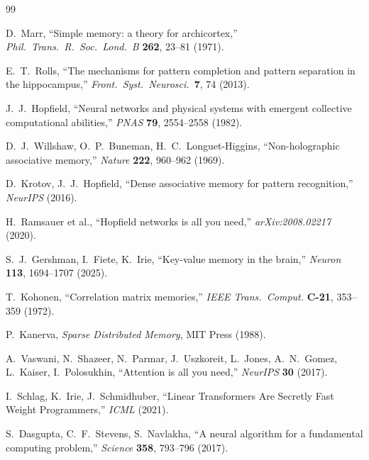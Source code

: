 \documentclass[11pt]{article}
\begin{document}

\begin{thebibliography}{99}

 D.~Marr, ``Simple memory: a theory for archicortex,''
\textit{Phil.\ Trans.\ R.\ Soc.\ Lond.\ B} \textbf{262}, 23--81 (1971).

 E.~T.~Rolls, ``The mechanisms for pattern completion and pattern
separation in the hippocampus,'' \textit{Front.\ Syst.\ Neurosci.}\ \textbf{7}, 74 (2013).

 J.~J.~Hopfield, ``Neural networks and physical systems with emergent
collective computational abilities,'' \textit{PNAS} \textbf{79}, 2554--2558 (1982).

 D.~J.~Willshaw, O.~P.~Buneman, H.~C.~Longuet-Higgins, ``Non-holographic
associative memory,'' \textit{Nature} \textbf{222}, 960--962 (1969).

 D.~Krotov, J.~J.~Hopfield, ``Dense associative memory for pattern
recognition,'' \textit{NeurIPS} (2016).

 H.~Ramsauer et al., ``Hopfield networks is all you need,''
\textit{arXiv:2008.02217} (2020).

 S.~J.~Gershman, I.~Fiete, K.~Irie, ``Key-value memory in the brain,''
\textit{Neuron} \textbf{113}, 1694--1707 (2025).

 T.~Kohonen, ``Correlation matrix memories,'' \textit{IEEE Trans.\
Comput.} \textbf{C-21}, 353--359 (1972).

 P.~Kanerva, \textit{Sparse Distributed Memory}, MIT Press (1988).

 A.~Vaswani, N.~Shazeer, N.~Parmar, J.~Uszkoreit, L.~Jones,
A.~N.~Gomez, L.~Kaiser, I.~Polosukhin, ``Attention is all you need,'' \textit{NeurIPS}
\textbf{30} (2017).

 I.~Schlag, K.~Irie, J.~Schmidhuber, ``Linear Transformers Are Secretly
Fast Weight Programmers,'' \textit{ICML} (2021).

 S.~Dasgupta, C.~F.~Stevens, S.~Navlakha, ``A neural algorithm for a
fundamental computing problem,'' \textit{Science} \textbf{358}, 793--796 (2017).

\end{thebibliography}
\end{document}
